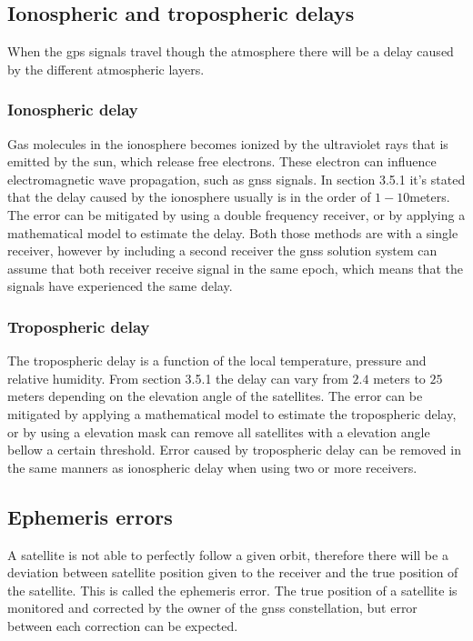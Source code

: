 \subsection{Ionospheric and tropospheric delays}\label{Ss:Atmosphere}
When the \gls{gps} signals travel though the atmosphere there will be a delay caused by the different atmospheric layers.
\subsubsection{Ionospheric delay}
Gas molecules in the ionosphere becomes ionized by the ultraviolet rays that is emitted by the sun, which release free electrons. These electron can influence electromagnetic wave propagation, such as \gls{gnss} signals. In \citep{vik2014integrated} section 3.5.1 it's stated that the delay caused by the ionosphere usually is in the order of $1-10 $meters. The error can be mitigated by using a double frequency receiver, or by applying a mathematical model to estimate the delay. Both those methods are with a single receiver, however by including a second receiver the \gls{gnss} solution system can assume that both receiver receive signal in the same epoch, which means that the signals have experienced the same delay.

\subsubsection{Tropospheric delay}
The tropospheric delay is a function of the local temperature, pressure and relative humidity. From \citep{vik2014integrated} section 3.5.1 the delay can vary from $2.4$ meters to $25$ meters depending on the elevation angle of the satellites. The error can be mitigated by applying a mathematical model to estimate the tropospheric delay, or by using a elevation mask can remove all satellites with a elevation angle bellow a certain threshold. Error caused by tropospheric delay can be removed in the same manners as ionospheric delay when using two or more receivers. 
\subsection{Ephemeris errors}
A satellite is not able to perfectly follow a given orbit, therefore there will be a deviation between satellite position given to the receiver and the true position of the satellite. This is called the ephemeris error. The true position of a satellite is monitored and corrected by the owner of the \gls{gnss} constellation, but error between each correction can be expected.
